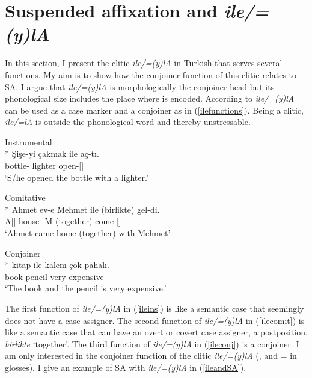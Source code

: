 \section{Suspended affixation and \textit{ile/=(y)lA}} \label{sec:ile}

In this section, I present the clitic \textit{ile/=(y)lA} in Turkish that serves several functions. My aim is to show how the conjoiner function of this clitic relates to SA. I argue that \textit{ile/=(y)lA} is morphologically the conjoiner head but its phonological size includes the place where {\Case} is encoded. According to \cite{goksel2004turkish} \textit{ile/=(y)lA} can be used as a case marker and a conjoiner as in (\ref{ilefunctions}). Being a clitic, \textit{ile/=lA} is outside the phonological word and thereby unstressable.

\begin{exe}
    \ex \label{ilefunctions} 
    \begin{xlist}
    \ex Instrumental \label{ileins}\\*
    \gll Şişe-yi çakmak ile aç-tı.\\ 
    bottle-{\Acc} lighter {\Ins} open-{\Pst}[{\Tsg}] \\
    \glt `S/he opened the bottle with a lighter.'
    
    \ex Comitative \label{ilecomit}\\*
    \gll Ahmet ev-e Mehmet ile (birlikte) gel-di. \\
    A[{\Nom}] house-{\Dat} M {\Com} (together) come-{\Pst}[{\Tsg}] \\
    \glt `Ahmet came home (together) with Mehmet'
    
    \ex Conjoiner \label{ileconj}\\*
    \gll kitap ile kalem çok pahalı. \\
    book {\And} pencil very expensive \\
    \glt `The book and the pencil is very expensive.'
    \end{xlist}
\end{exe}

The first function of \textit{ile/=(y)lA} in (\ref{ileins}) is like a semantic case \cite{woolford2006lexical} that seemingly does not have a case assigner. The second function of \textit{ile/=(y)lA} in (\ref{ilecomit}) is like a semantic case that can have an overt or covert case assigner, a postposition, \textit{birlikte} `together'. The third function of \textit{ile/=(y)lA} in (\ref{ileconj}) is a conjoiner. I am only interested in the conjoiner function of the clitic \textit{ile/=(y)lA} ({\And}, and ={\And} in glosses). I give an example of SA with \textit{ile/=(y)lA} in (\ref{ileandSA}).

